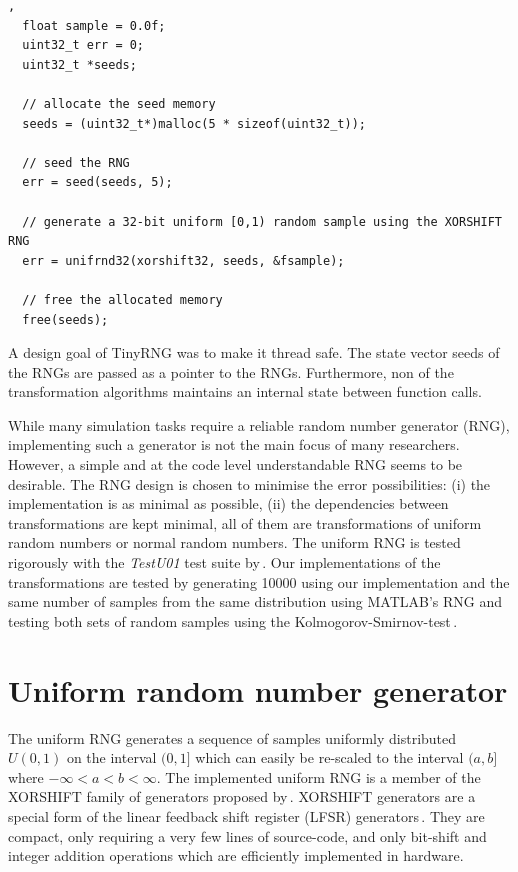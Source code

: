 \documentclass[a4paper]{scrartcl}
\begin{document}
\begin{lstlisting}[float, caption={Example code generating a uniform random sample on the interval $[0,1)$.}],
  float sample = 0.0f;
  uint32_t err = 0;
  uint32_t *seeds;

  // allocate the seed memory
  seeds = (uint32_t*)malloc(5 * sizeof(uint32_t));

  // seed the RNG
  err = seed(seeds, 5);
 
  // generate a 32-bit uniform [0,1) random sample using the XORSHIFT RNG
  err = unifrnd32(xorshift32, seeds, &fsample);

  // free the allocated memory
  free(seeds);
\end{lstlisting}

A design goal of TinyRNG was to make it thread safe. The state vector seeds of the RNGs are passed as a pointer to the RNGs. Furthermore, non of the transformation algorithms maintains an internal state between function calls.   




\label{app:random_number_generation}
While many simulation tasks require a reliable random number generator (RNG), implementing  such a generator is not the main focus of many researchers. However, a simple and at the code level understandable RNG seems to be desirable. The RNG design is chosen to minimise the error possibilities: (i) the implementation is as minimal as possible, (ii) the dependencies between transformations are kept minimal, all of them are transformations of uniform random numbers or normal random numbers. The uniform RNG is tested rigorously with the {\it TestU01} test suite by\,\cite{L'Ecuyer2007}. Our implementations of the transformations are tested by generating 10000 using our implementation and the same number of samples from the same distribution using MATLAB's RNG and testing both sets of random samples using the Kolmogorov-Smirnov-test\,\citep{Dudewicz1988}.



\section*{Uniform random number generator}
The uniform RNG generates a sequence of samples uniformly distributed $U(0,1)$ on the interval $(0,1]$ which can easily be re-scaled to the interval $(a, b]$  where $-\infty < a < b < \infty$. The implemented uniform RNG is a member of the XORSHIFT family of generators proposed by\,\citep{Marsaglia2003}. XORSHIFT generators are a special form of the linear feedback shift register (LFSR) generators\,\citep{Brent2004, Panneton2005}. They  are compact, only requiring a very few lines of source-code, and only bit-shift and integer addition operations which are efficiently implemented in hardware.
\end{document}
